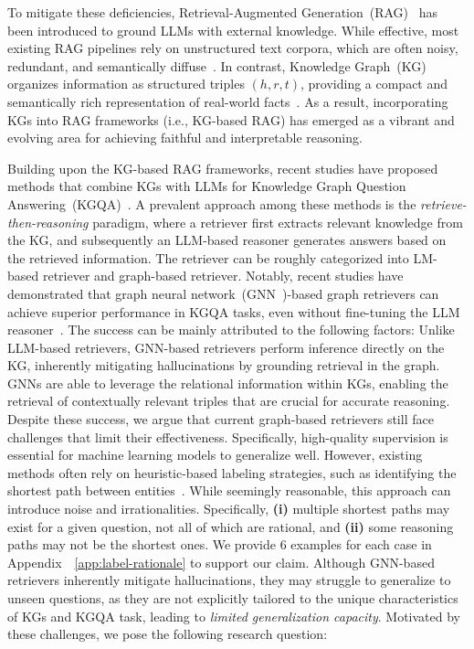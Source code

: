\documentclass{article}
\theoremstyle{plain}
\theoremstyle{definition}
\theoremstyle{remark}
\newcommand{\ti}[1]{\textit{#1}}
\newcommand{\tb}[1]{\textbf{#1}}
\begin{document}
To mitigate these deficiencies, Retrieval-Augmented Generation~(RAG)~\cite{gao2024retrievalaugmented,lewis2020retrieval} has been introduced to ground LLMs with external knowledge. While effective, most existing RAG pipelines rely on unstructured text corpora, which are often noisy, redundant, and semantically diffuse~\cite{shuster-etal-2021-retrieval-augmentation,gao2024retrievalaugmented}. In contrast, Knowledge Graph~(KG)~\cite{hogan2021knowledge} organizes information as structured triples $(h, r, t)$, providing a compact and semantically rich representation of real-world facts~\cite{chein2008graph,robinson2015graph}. As a result, incorporating KGs into RAG frameworks (i.e., KG-based RAG) has emerged as a vibrant and evolving area for achieving faithful and interpretable reasoning.

Building upon the KG-based RAG frameworks, recent studies have proposed methods that combine KGs with LLMs for Knowledge Graph Question Answering~(KGQA)~\cite{wang2023knowledge,dehghan-etal-2024-ewek,mavromatis2022rearev,luo2024rog,mavromatis2024gnn,chen2024plan,li2024simple}. A prevalent approach among these methods is the \ti{retrieve-then-reasoning} paradigm, where a retriever first extracts relevant knowledge from the KG, and subsequently an LLM-based reasoner generates answers based on the retrieved information. The retriever can be roughly categorized into LM-based retriever and graph-based retriever. Notably, recent studies have demonstrated that graph neural network~(GNN~\cite{kipf2016semi,hamilton2017inductive,velickovic2017graph,xu2018how})-based graph retrievers can achieve superior performance in KGQA tasks, even without fine-tuning the LLM reasoner~\cite{mavromatis2022rearev,li2024simple}. The success can be mainly attributed to the following factors:  Unlike LLM-based retrievers, GNN-based retrievers perform inference directly on the KG, inherently mitigating hallucinations by grounding retrieval in the graph.  GNNs are able to leverage the relational information within KGs, enabling the retrieval of contextually relevant triples that are crucial for accurate reasoning. Despite these success, we argue that current graph-based retrievers still face challenges that limit their effectiveness. Specifically,  high-quality supervision is essential for machine learning models to generalize well. However, existing methods often rely on heuristic-based labeling strategies, such as identifying the shortest path between entities~\cite{luo2024rog,mavromatis2024gnn,li2024simple}. While seemingly reasonable, this approach can introduce noise and irrationalities. Specifically, \tb{(i)} multiple shortest paths may exist for a given question, not all of which are rational, and \tb{(ii)} some reasoning paths may not be the shortest ones. We provide 6 examples for each case in Appendix~~\ref{app:label-rationale} to support our claim.  Although GNN-based retrievers inherently mitigate hallucinations, they may struggle to generalize to unseen questions, as they are not explicitly tailored to the unique characteristics of KGs and KGQA task, leading to \ti{limited generalization capacity}. Motivated by these challenges, we pose the following research question:
\end{document}
